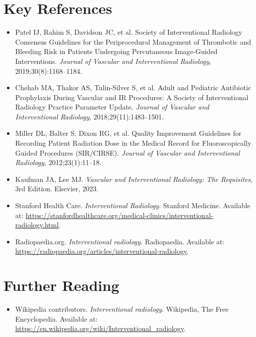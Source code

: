 \section{Key References}

\begin{itemize}
    \item Patel IJ, Rahim S, Davidson JC, et al. Society of Interventional Radiology Consensus Guidelines for the Periprocedural Management of Thrombotic and Bleeding Risk in Patients Undergoing Percutaneous Image-Guided Interventions. \textit{Journal of Vascular and Interventional Radiology}, 2019;30(8):1168--1184.
    \item Chehab MA, Thakor AS, Tulin-Silver S, et al. Adult and Pediatric Antibiotic Prophylaxis During Vascular and IR Procedures: A Society of Interventional Radiology Practice Parameter Update. \textit{Journal of Vascular and Interventional Radiology}, 2018;29(11):1483--1501.
    \item Miller DL, Balter S, Dixon RG, et al. Quality Improvement Guidelines for Recording Patient Radiation Dose in the Medical Record for Fluoroscopically Guided Procedures (SIR/CIRSE). \textit{Journal of Vascular and Interventional Radiology}, 2012;23(1):11--18.
    \item Kaufman JA, Lee MJ. \textit{Vascular and Interventional Radiology: The Requisites}, 3rd Edition. Elsevier, 2023.
    \item Stanford Health Care. \textit{Interventional Radiology}. Stanford Medicine. Available at: \url{https://stanfordhealthcare.org/medical-clinics/interventional-radiology.html}.
    \item Radiopaedia.org. \textit{Interventional radiology}. Radiopaedia. Available at: \url{https://radiopaedia.org/articles/interventional-radiology}.
\end{itemize}

\section{Further Reading}
\begin{itemize}
  \item Wikipedia contributors. \textit{Interventional radiology}. Wikipedia, The Free Encyclopedia. Available at: \url{https://en.wikipedia.org/wiki/Interventional_radiology}.
\end{itemize}
